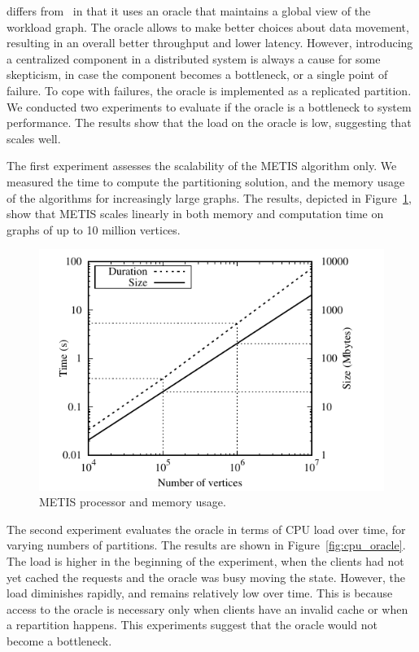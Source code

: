\dynastar differs from \dssmr\ in that it uses an oracle
that maintains a global view of the workload graph. The oracle allows
\dynastar to make better choices about data movement, resulting in an overall
better throughput and lower latency. However, introducing a centralized
component in a distributed system is always a cause for some skepticism,
in case the component becomes a bottleneck, or a single point of failure. 
To cope with failures, the oracle is implemented as a replicated partition. 
We conducted two experiments to evaluate if the \dynastar oracle is a bottleneck to
system performance. The results show that the load on the oracle is
low, suggesting that \dynastar scales well.


The first experiment assesses the scalability of the METIS algorithm only.
We measured the time to compute the partitioning solution, and
the memory usage of the algorithms for increasingly large graphs. 
The results, depicted in Figure~\ref{fig:metis_size_time}, show that METIS scales
linearly in both memory and computation time on graphs of up to 10 million vertices.

\begin{figure}[ht!]
  \centering
    \includegraphics[width=\columnwidth]{figures/metis_size_time}
	\caption{METIS processor and memory usage.}
	\label{fig:metis_size_time}
\end{figure}

The second experiment evaluates the oracle in terms of CPU load over
time, for varying numbers of partitions. The results are shown in
Figure~\ref{fig:cpu_oracle}. The load is higher in the
beginning of the experiment, when the clients had not yet cached the
requests and the oracle was busy moving the state. However, the load diminishes rapidly, and remains relatively
low over time. This is because access to the oracle is necessary only
when clients have an invalid cache or when a repartition happens. This experiments
suggest that the oracle would not become a bottleneck.%

